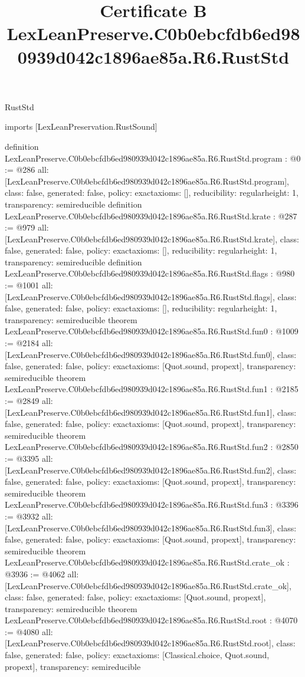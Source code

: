 \begin{lexlean}{RustStd}
\title{Certificate B LexLeanPreserve.C0b0ebcfdb6ed980939d042c1896ae85a.R6.RustStd}
\begin{coremodule}
imports [LexLeanPreservation.RustSound]

definition LexLeanPreserve.C0b0ebcfdb6ed980939d042c1896ae85a.R6.RustStd.program : @0 := @286 {
  all: [LexLeanPreserve.C0b0ebcfdb6ed980939d042c1896ae85a.R6.RustStd.program],
  class: false,
  generated: false,
  policy: exact{axioms: []},
  reducibility: regular{height: 1},
  transparency: semireducible
}
definition LexLeanPreserve.C0b0ebcfdb6ed980939d042c1896ae85a.R6.RustStd.krate : @287 := @979 {
  all: [LexLeanPreserve.C0b0ebcfdb6ed980939d042c1896ae85a.R6.RustStd.krate],
  class: false,
  generated: false,
  policy: exact{axioms: []},
  reducibility: regular{height: 1},
  transparency: semireducible
}
definition LexLeanPreserve.C0b0ebcfdb6ed980939d042c1896ae85a.R6.RustStd.flags : @980 := @1001 {
  all: [LexLeanPreserve.C0b0ebcfdb6ed980939d042c1896ae85a.R6.RustStd.flags],
  class: false,
  generated: false,
  policy: exact{axioms: []},
  reducibility: regular{height: 1},
  transparency: semireducible
}
theorem LexLeanPreserve.C0b0ebcfdb6ed980939d042c1896ae85a.R6.RustStd.fun0 : @1009 := @2184 {
  all: [LexLeanPreserve.C0b0ebcfdb6ed980939d042c1896ae85a.R6.RustStd.fun0],
  class: false,
  generated: false,
  policy: exact{axioms: [Quot.sound, propext]},
  transparency: semireducible
}
theorem LexLeanPreserve.C0b0ebcfdb6ed980939d042c1896ae85a.R6.RustStd.fun1 : @2185 := @2849 {
  all: [LexLeanPreserve.C0b0ebcfdb6ed980939d042c1896ae85a.R6.RustStd.fun1],
  class: false,
  generated: false,
  policy: exact{axioms: [Quot.sound, propext]},
  transparency: semireducible
}
theorem LexLeanPreserve.C0b0ebcfdb6ed980939d042c1896ae85a.R6.RustStd.fun2 : @2850 := @3395 {
  all: [LexLeanPreserve.C0b0ebcfdb6ed980939d042c1896ae85a.R6.RustStd.fun2],
  class: false,
  generated: false,
  policy: exact{axioms: [Quot.sound, propext]},
  transparency: semireducible
}
theorem LexLeanPreserve.C0b0ebcfdb6ed980939d042c1896ae85a.R6.RustStd.fun3 : @3396 := @3932 {
  all: [LexLeanPreserve.C0b0ebcfdb6ed980939d042c1896ae85a.R6.RustStd.fun3],
  class: false,
  generated: false,
  policy: exact{axioms: [Quot.sound, propext]},
  transparency: semireducible
}
theorem LexLeanPreserve.C0b0ebcfdb6ed980939d042c1896ae85a.R6.RustStd.crate_ok : @3936 := @4062 {
  all: [LexLeanPreserve.C0b0ebcfdb6ed980939d042c1896ae85a.R6.RustStd.crate_ok],
  class: false,
  generated: false,
  policy: exact{axioms: [Quot.sound, propext]},
  transparency: semireducible
}
theorem LexLeanPreserve.C0b0ebcfdb6ed980939d042c1896ae85a.R6.RustStd.root : @4070 := @4080 {
  all: [LexLeanPreserve.C0b0ebcfdb6ed980939d042c1896ae85a.R6.RustStd.root],
  class: false,
  generated: false,
  policy: exact{axioms: [Classical.choice, Quot.sound, propext]},
  transparency: semireducible
}


\end{coremodule}
\end{lexlean}
